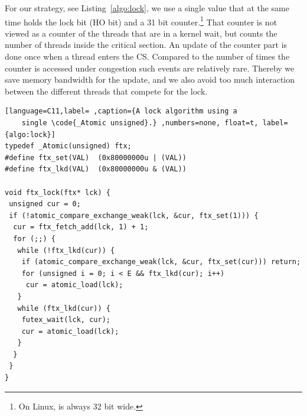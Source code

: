 For our strategy, see Listing~\ref{algo:lock}, we use a single  value that at the same
time holds the lock bit (HO bit) and a 31 bit counter.\footnote{On Linux,  is always 32 bit wide.}
That counter
\iflong%
is not viewed as a counter of the threads that are in a kernel wait, but
\fi
counts the number of threads inside the critical
section.  An update of the counter part is done once when a
thread enters the CS.
\iflong%
Compared to the number of times
the counter is accessed under congestion such events are relatively
rare. Thereby we save memory bandwidth for the update, and we also
avoid too much interaction between the different threads that
compete for the lock.
\fi
\begin{lstlisting}[language=C11,label= ,caption={A lock algorithm using a
    single \code{_Atomic unsigned}.} ,numbers=none, float=t, label={algo:lock}]
typedef _Atomic(unsigned) ftx;
#define ftx_set(VAL)  (0x80000000u | (VAL))
#define ftx_lkd(VAL)  (0x80000000u & (VAL))

void ftx_lock(ftx* lck) {
 unsigned cur = 0;
 if (!atomic_compare_exchange_weak(lck, &cur, ftx_set(1))) {
  cur = ftx_fetch_add(lck, 1) + 1;
  for (;;) {
   while (!ftx_lkd(cur)) {
    if (atomic_compare_exchange_weak(lck, &cur, ftx_set(cur))) return;
    for (unsigned i = 0; i < E && ftx_lkd(cur); i++)
     cur = atomic_load(lck);
   }
   while (ftx_lkd(cur)) {
    futex_wait(lck, cur);
    cur = atomic_load(lck);
   }
  }
 }
}
\end{lstlisting}

